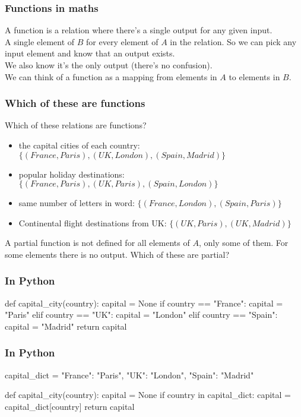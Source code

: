 \documentclass{beamer}
\begin{document}
\begin{frame}[fragile]
\frametitle{Functions in maths}
A function is a relation where there's a single output for
any given input. \\
A single element of $B$ for every element of $A$ in the relation.
So we can pick any input element and know that an output
exists. \\
We also know it's the only output (there's no confusion). \\
We can think of a function as a mapping from elements in $A$
to elements in $B$.

\end{frame}


\begin{frame}[fragile]
\frametitle{Which of these are functions}

Which of these relations are functions?
 
\begin{itemize} 
\item the capital cities of each country: $\{(France, Paris), (UK,
  London), (Spain, Madrid) \}$
\item popular holiday destinations: $\{ (France, Paris), (UK, Paris),
  (Spain, London) \}$
\item same number of letters in word: $\{ (France, London), (Spain,
  Paris) \}$
\item Continental flight destinations from UK: $\{ (UK, Paris), (UK, Madrid) \}$
\end{itemize}
\pause
A partial function is not defined for all elements of $A$, only some
of them. For some elements there is no output. Which of these are partial?
\end{frame}

\begin{frame}[fragile]
\frametitle{In Python}
\begin{code}
def capital_city(country):
   capital = None
   if country == "France":
      capital = "Paris"
   elif country == "UK":
      capital = "London"
   elif country == "Spain":
      capital = "Madrid"
   return capital
\end{code}
\end{frame}

\begin{frame}[fragile]
\frametitle{In Python}
\begin{code}
capital_dict = { 
  "France": "Paris", 
  "UK":     "London", 
  "Spain":  "Madrid" 
}

def capital_city(country):
   capital = None
   if country in capital_dict:
      capital = capital_dict[country]
   return capital
\end{code}
\end{frame}
\end{document}
